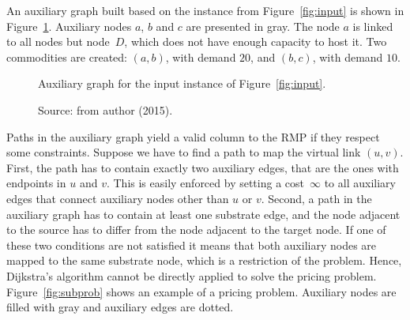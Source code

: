 An auxiliary graph  built based on the instance from Figure~\ref{fig:input} is shown in Figure~\ref{fig:aux}. 
Auxiliary nodes $a$, $b$ and $c$ are presented in gray. The node $a$ is linked to all nodes but node~$D$, which does not have enough capacity to host it. Two commodities are created: $(a,b)$, with demand $20$, and $(b,c)$, with demand $10$.

\begin{figure}[!h]
  \centering
  \caption{Auxiliary graph for the input instance of Figure~\ref{fig:input}.\label{fig:aux}}   
\caption*{Source: from author (2015).}\end{figure}

Paths in the auxiliary graph yield a valid column to the RMP if they respect some constraints.
Suppose we have to find a path to map the virtual link $(u,v)$.
First, the path has to contain exactly two auxiliary edges, that are the ones with endpoints in $u$ and $v$. This is easily enforced by setting a cost~$\infty$ to all auxiliary edges that connect auxiliary nodes other than $u$ or $v$.
Second, a path in the auxiliary graph has to contain at least one substrate edge, 
and the node adjacent to the source has to differ from the node adjacent to the target node. 
If one of these two conditions are not satisfied it means that both auxiliary nodes are mapped to the same substrate node, which is a restriction of the problem.
Hence, Dijkstra's algorithm cannot be directly applied to solve the pricing problem. 
Figure~\ref{fig:subprob} shows an example of a pricing problem. 
Auxiliary nodes are filled with gray and auxiliary edges are dotted. %

